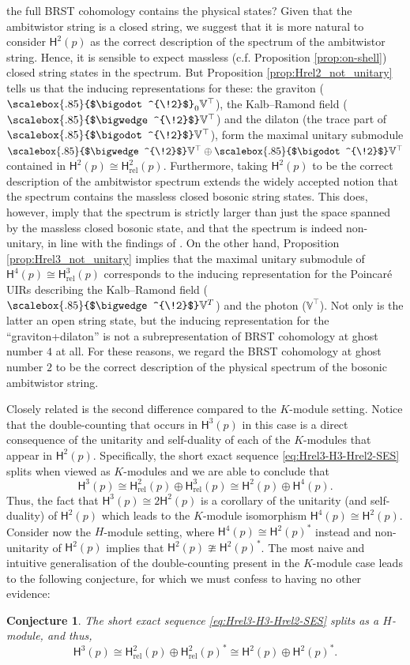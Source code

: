 \documentclass[11pt,reqno,a4paper,final]{amsart}
\newcommand\ext[1]{\scalebox{.85}{$\bigwedge^{\!#1}$}}
\newcommand\sym[1]{\scalebox{.85}{$\bigodot^{\!#1}$}}
\theoremstyle{plain}
\newtheorem{conjecture}[lemma]{Conjecture}
\theoremstyle{definition}
\newcommand{\sH}{\mathsf{H}}
\newcommand{\Hrel}{\mathsf{H}_{\mathrm{rel}}}
\newcommand{\VV}{\mathbb{V}}
\newcommand{\1}{\mathbb{1}}
\numberwithin{equation}{section}
\begin{document}
the full BRST cohomology contains the physical states? 
Given that the ambitwistor string is a closed string,
we suggest that it is more natural to consider $\sH^2(p)$ as the
correct description of the spectrum of the ambitwistor string. Hence,
it is sensible to expect massless (c.f. Proposition \ref{prop:on-shell})
closed string states in the spectrum. But Proposition \ref{prop:Hrel2_not_unitary} 
tells us that the inducing representations for these: the graviton ($\sym{2}_0\VV^\top$), 
the Kalb--Ramond field ($\ext{2}\VV^\top$)
and the dilaton (the trace part of $\sym{2}\VV^\top$),
form the maximal unitary submodule $\ext{2}\VV^\top \oplus \sym{2}\VV^\top$
contained in $\sH^2(p)\cong \Hrel^2(p)$.  Furthermore,  taking
$\sH^2(p)$ to be the correct description  of the ambitwistor spectrum
extends the widely accepted notion that the spectrum contains the
massless closed bosonic string states. This does, however, imply that
the spectrum is strictly larger than just the space spanned by the
massless closed bosonic state, and that the spectrum is indeed
non-unitary, in line with the findings of \cite{Berkovits:2018jvm}. On
the other hand, Proposition \ref{prop:Hrel3_not_unitary} implies that
the maximal unitary submodule of $\sH^4(p) \cong \Hrel^3(p)$
corresponds to the inducing representation for the Poincaré UIRs
describing the Kalb--Ramond field ($\ext{2}\VV^T$) and the photon
($\VV^\top$). Not only is the latter an open string state, but the
inducing representation for the ``graviton+dilaton'' is not a
subrepresentation of BRST cohomology at ghost number $4$ at all.
For these reasons, we regard the BRST cohomology at ghost number $2$ 
to be the correct description of the physical spectrum of the bosonic
ambitwistor string.

Closely related is the second difference compared to the $K$-module
setting. Notice that the double-counting that occurs in $\sH^3(p)$ in
this case is a direct consequence of the unitarity and self-duality of
each of the $K$-modules that appear in $\sH^2(p)$. Specifically, the
short exact sequence \eqref{eq:Hrel3-H3-Hrel2-SES} splits when viewed
as $K$-modules and we are able to conclude that
\begin{equation}
  \sH^3(p) \cong \Hrel^2(p) \oplus \Hrel^3(p) \cong \sH^2(p) \oplus \sH^4(p).
\end{equation}
Thus, the fact that $\sH^3(p) \cong 2\sH^2(p)$ is a corollary of the
unitarity (and self-duality) of $\sH^2(p)$ which leads to the
$K$-module isomorphism $\sH^4(p) \cong \sH^2(p)$. Consider now the
$H$-module setting, where $\sH^4(p) \cong \sH^2(p)^*$ instead and
non-unitarity of $\sH^2(p)$ implies that $\sH^2(p) \ncong
\sH^2(p)^*$. The most naive and intuitive generalisation of the
double-counting present in the $K$-module case leads to the following
conjecture, for which we must confess to having no other evidence:
\begin{conjecture}
    The short exact sequence \eqref{eq:Hrel3-H3-Hrel2-SES} splits as a $H$-module, and thus,
    \begin{equation}
        \sH^3(p) \cong \Hrel^2(p) \oplus \Hrel^2(p)^* \cong \sH^2(p) \oplus \sH^2(p)^*.
    \end{equation}
\end{conjecture}
\end{document}

